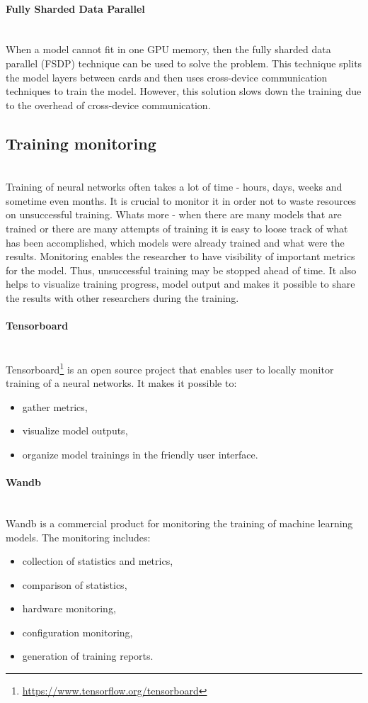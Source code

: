 \paragraph{Fully Sharded Data Parallel}\mbox{} \\
\indent When a model cannot fit in one GPU memory, then the fully sharded data parallel (FSDP) technique can be used to solve the problem. This technique splits the model layers between cards and then uses cross-device communication techniques to train the model. However, this solution slows down the training due to the overhead of cross-device communication.

\subsection{Training monitoring}\mbox{}\\
\indent Training of neural networks often takes a lot of time - hours, days, weeks and sometime even months. It is crucial to monitor it in order not to waste resources on unsuccessful training. Whats more - when there are many models that are trained or there are many attempts of training it is easy to loose track of what has been accomplished, which models were already trained and what were the results. 
Monitoring enables the researcher to have visibility of important metrics for the model. Thus, unsuccessful training may be stopped ahead of time. It also helps to visualize training progress, model output and makes it possible to share the results with other researchers during the training. 
\paragraph{Tensorboard}\mbox{}\\
\indent Tensorboard\footnote{\url{https://www.tensorflow.org/tensorboard}} is an open source project that enables user to locally monitor training of a neural networks. It makes it possible to:
\begin{itemize}
    \item gather metrics,
    \item visualize model outputs,
    \item organize model trainings in the friendly user interface.
\end{itemize}


\paragraph{Wandb}\mbox{}\\
\indent Wandb is a commercial product for monitoring the training of machine learning models. The monitoring includes:
\begin{itemize}
    \item collection of statistics and metrics,
    \item comparison of statistics,
    \item hardware monitoring,
    \item configuration monitoring,
    \item generation of training reports.
\end{itemize}

